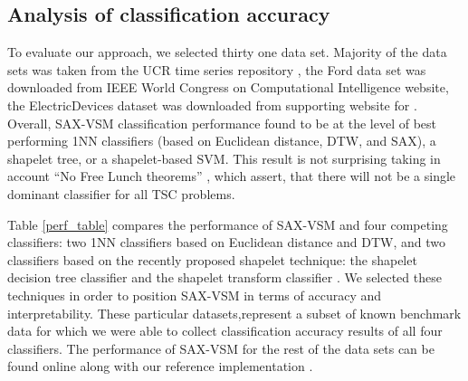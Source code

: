 \documentclass{llncs}
\begin{document}
\subsection{Analysis of classification accuracy}
To evaluate our approach, we selected thirty one data set. Majority of the data sets was taken 
from the UCR time series repository \cite{ucr}, the Ford data set was downloaded from 
IEEE World Congress on Computational Intelligence \cite{ford} website, the 
ElectricDevices dataset was downloaded from supporting website for \cite{bagnal}. 
Overall, SAX-VSM classification performance found to be at the level of best 
performing 1NN classifiers (based on Euclidean distance, DTW, and SAX), 
a shapelet tree, or a shapelet-based SVM. 
This result is not surprising taking in account ``No Free Lunch theorems'' \cite{nfl}, 
which assert, that there will not be a single dominant classifier for all TSC problems.

Table \ref{perf_table} compares the performance of SAX-VSM and four competing 
classifiers: two 1NN classifiers based on Euclidean distance and DTW, 
and two classifiers based on the recently proposed shapelet technique: 
the shapelet decision tree \cite{shapelet, logical} classifier and 
the shapelet transform classifier \cite{bagnal}. 
We selected these techniques in order to position SAX-VSM in terms of accuracy 
and interpretability. 
These particular datasets,represent a subset of known benchmark data for which 
we were able to collect classification accuracy results of all four classifiers. 
The performance of SAX-VSM for the rest of the data sets can be found online 
along with our reference implementation \cite{jmotif}.
\end{document}
